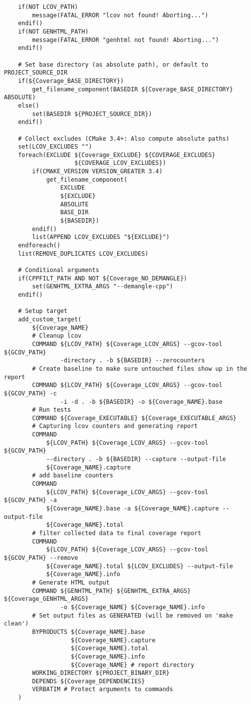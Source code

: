 \begin{verbatim}
    if(NOT LCOV_PATH)
        message(FATAL_ERROR "lcov not found! Aborting...")
    endif()
    if(NOT GENHTML_PATH)
        message(FATAL_ERROR "genhtml not found! Aborting...")
    endif()

    # Set base directory (as absolute path), or default to PROJECT_SOURCE_DIR
    if(${Coverage_BASE_DIRECTORY})
        get_filename_component(BASEDIR ${Coverage_BASE_DIRECTORY} ABSOLUTE)
    else()
        set(BASEDIR ${PROJECT_SOURCE_DIR})
    endif()

    # Collect excludes (CMake 3.4+: Also compute absolute paths)
    set(LCOV_EXCLUDES "")
    foreach(EXCLUDE ${Coverage_EXCLUDE} ${COVERAGE_EXCLUDES}
                    ${COVERAGE_LCOV_EXCLUDES})
        if(CMAKE_VERSION VERSION_GREATER 3.4)
            get_filename_component(
                EXCLUDE
                ${EXCLUDE}
                ABSOLUTE
                BASE_DIR
                ${BASEDIR})
        endif()
        list(APPEND LCOV_EXCLUDES "${EXCLUDE}")
    endforeach()
    list(REMOVE_DUPLICATES LCOV_EXCLUDES)

    # Conditional arguments
    if(CPPFILT_PATH AND NOT ${Coverage_NO_DEMANGLE})
        set(GENHTML_EXTRA_ARGS "--demangle-cpp")
    endif()

    # Setup target
    add_custom_target(
        ${Coverage_NAME}
        # Cleanup lcov
        COMMAND ${LCOV_PATH} ${Coverage_LCOV_ARGS} --gcov-tool ${GCOV_PATH}
                -directory . -b ${BASEDIR} --zerocounters
        # Create baseline to make sure untouched files show up in the report
        COMMAND ${LCOV_PATH} ${Coverage_LCOV_ARGS} --gcov-tool ${GCOV_PATH} -c
                -i -d . -b ${BASEDIR} -o ${Coverage_NAME}.base
        # Run tests
        COMMAND ${Coverage_EXECUTABLE} ${Coverage_EXECUTABLE_ARGS}
        # Capturing lcov counters and generating report
        COMMAND
            ${LCOV_PATH} ${Coverage_LCOV_ARGS} --gcov-tool ${GCOV_PATH}
            --directory . -b ${BASEDIR} --capture --output-file
            ${Coverage_NAME}.capture
        # add baseline counters
        COMMAND
            ${LCOV_PATH} ${Coverage_LCOV_ARGS} --gcov-tool ${GCOV_PATH} -a
            ${Coverage_NAME}.base -a ${Coverage_NAME}.capture --output-file
            ${Coverage_NAME}.total
        # filter collected data to final coverage report
        COMMAND
            ${LCOV_PATH} ${Coverage_LCOV_ARGS} --gcov-tool ${GCOV_PATH} --remove
            ${Coverage_NAME}.total ${LCOV_EXCLUDES} --output-file
            ${Coverage_NAME}.info
        # Generate HTML output
        COMMAND ${GENHTML_PATH} ${GENHTML_EXTRA_ARGS} ${Coverage_GENHTML_ARGS}
                -o ${Coverage_NAME} ${Coverage_NAME}.info
        # Set output files as GENERATED (will be removed on 'make clean')
        BYPRODUCTS ${Coverage_NAME}.base
                   ${Coverage_NAME}.capture
                   ${Coverage_NAME}.total
                   ${Coverage_NAME}.info
                   ${Coverage_NAME} # report directory
        WORKING_DIRECTORY ${PROJECT_BINARY_DIR}
        DEPENDS ${Coverage_DEPENDENCIES}
        VERBATIM # Protect arguments to commands
    )


\end{verbatim}
